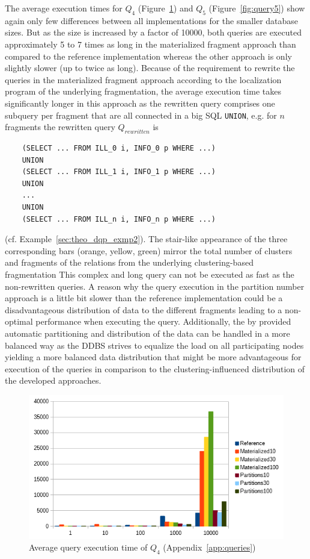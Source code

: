 The average execution times for $Q_4$ (Figure~\ref{fig:query4}) and $Q_5$ (Figure~\ref{fig:query5}) show again only few differences between all 
implementations for the smaller database sizes. But as the size is increased by a factor of 10000, both queries are executed approximately 5 to 7 times as long 
in the materialized fragment approach than compared to the reference implementation whereas the other approach is only slightly slower (up to twice as long).
Because of the requirement to rewrite the queries in the materialized fragment approach according to the localization program of the underlying fragmentation,
the average execution time takes significantly longer in this approach as the rewritten query comprises one subquery per fragment that are all connected in a 
big SQL \verb!UNION!, e.g. for $n$ fragments the rewritten query $Q_{rewritten}$ is
\begin{verbatim}
    (SELECT ... FROM ILL_0 i, INFO_0 p WHERE ...)
    UNION
    (SELECT ... FROM ILL_1 i, INFO_1 p WHERE ...)
    UNION
    ...
    UNION
    (SELECT ... FROM ILL_n i, INFO_n p WHERE ...)
\end{verbatim}
(cf. Example~\ref{sec:theo_dqp_exmp2}). The stair-like appearance of the three corresponding bars (orange, yellow, green) mirror the total number of clusters 
and fragments of the relations from the underlying clustering-based fragmentation This complex and long query can not be executed as fast as the non-rewritten
queries. A reason why the query execution in the partition number approach is a little bit slower than the reference implementation could be a disadvantageous
distribution of data to the different fragments leading to a non-optimal performance when executing the query. Additionally, the by  provided
automatic partitioning and distribution of the data can be handled in a more balanced way as the DDBS strives to equalize the load on all participating nodes
yielding a more balanced data distribution that might be more advantageous for execution of the queries in comparison to the clustering-influenced distribution
of the developed approaches.
\begin{figure}[h]
    \centering
    \includegraphics[scale=0.8]{charts/Query4.png}
    \caption{Average query execution time of $Q_4$ (Appendix~\ref{app:queries})}
    \label{fig:query4}
\end{figure}

